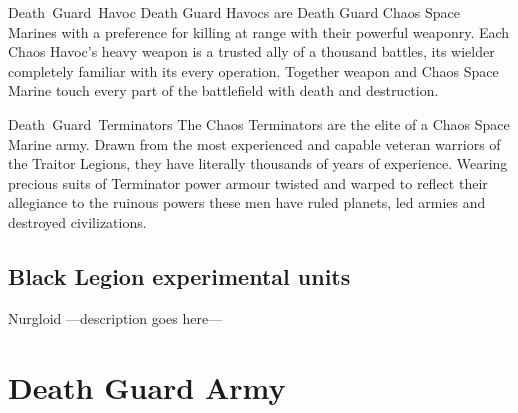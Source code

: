 \documentclass[a4paper, twocolumn]{article}
\begin{document}
\unit{Death Guard Havoc} {
  Death Guard Havocs are Death Guard Chaos Space Marines with a preference for killing at range with their powerful weaponry. Each
  Chaos Havoc's heavy weapon is a trusted ally of a thousand battles, its wielder completely familiar with its every operation.
  Together weapon and Chaos Space Marine touch every part of the battlefield with death and destruction.
}
\statsEND

\unit{Death Guard Terminators} {
  The Chaos Terminators are the elite of a Chaos Space Marine army. Drawn from the most experienced and capable veteran warriors of
  the Traitor Legions, they have literally thousands of years of experience. Wearing precious suits of Terminator power armour
  twisted and warped to reflect their allegiance to the ruinous powers these men have ruled planets, led armies and destroyed
  civilizations.
}
\statsEND


\clearpage
\subsection{Black Legion experimental units}

\unit{Nurgloid} {							%
	---description goes here---
}
\statsEND									%

\twocolumn
%
\clearpage
\section{Death Guard Army}
\end{document}
